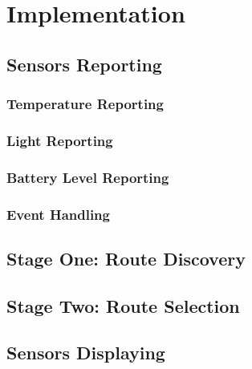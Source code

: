 \chapter{Implementation}
\label{chap:implementation}

\section{Sensors Reporting}

\subsection{Temperature Reporting}
\subsection{Light Reporting}
\subsection{Battery Level Reporting}
\subsection{Event Handling}

\section{Stage One: Route Discovery}

\section{Stage Two: Route Selection}

\section{Sensors Displaying}






